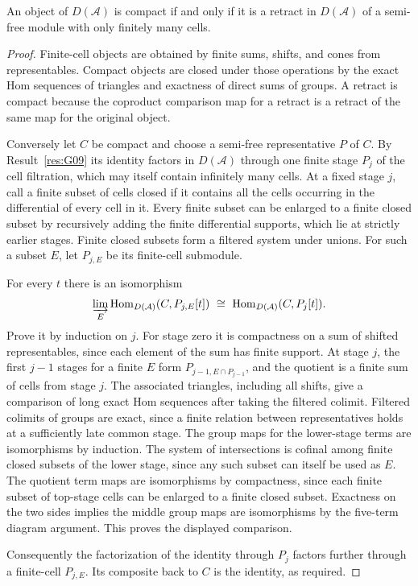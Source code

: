 \begin{theorem}\label{res:G11}
An object of \(D(\mathcal A)\) is compact if and only if it is
a retract in \(D(\mathcal A)\) of a semi-free module with only
finitely many cells.
\end{theorem}
\begin{proof}
Finite-cell objects are obtained by finite sums, shifts, and
cones from representables. Compact objects are closed under
those operations by the exact Hom sequences of triangles and
exactness of direct sums of groups. A retract is compact because
the coproduct comparison map for a retract is a retract of the
same map for the original object.

Conversely let \(C\) be compact and choose a semi-free
representative \(P\) of \(C\). By Result~\ref{res:G09} its identity
factors in \(D(\mathcal A)\) through one finite stage \(P_j\) of
the cell filtration, which may itself contain infinitely many
cells. At a fixed stage \(j\), call a finite subset of cells
closed if it contains all the cells occurring in the differential of
every cell in it. Every finite subset can be enlarged to a finite
closed subset by recursively adding the finite differential
supports, which lie at strictly earlier stages. Finite closed
subsets form a filtered system under unions. For such a subset
\(E\), let \(P_{j,E}\) be its finite-cell submodule.

For every \(t\) there is an isomorphism
\[
 \varinjlim_E\operatorname{Hom}_{D(\mathcal A)}(C,P_{j,E}[t])
     \ \cong\ \operatorname{Hom}_{D(\mathcal A)}(C,P_j[t]).
\]
Prove it by induction on \(j\). For stage zero it is compactness
on a sum of shifted representables, since each element of the sum
has finite support. At stage \(j\), the first \(j-1\) stages for a
finite \(E\) form \(P_{j-1,E\cap P_{j-1}}\), and the quotient is a
finite sum of cells from stage \(j\). The associated triangles,
including all shifts, give a comparison of long exact Hom sequences
after taking the filtered colimit. Filtered colimits of groups
are exact, since a finite relation between representatives holds
at a sufficiently late common stage. The group maps for the
lower-stage terms are isomorphisms by induction. The system of
intersections is cofinal among finite closed subsets of the
lower stage, since any such subset can itself be used as \(E\).
The quotient term maps are isomorphisms by compactness, since
each finite subset of top-stage cells can be enlarged to a finite
closed subset. Exactness on the two sides implies the middle
group maps are isomorphisms by the five-term diagram argument.
This proves the displayed comparison.

Consequently the factorization of the identity through \(P_j\)
factors further through a finite-cell \(P_{j,E}\). Its composite
back to \(C\) is the identity, as required.
\end{proof}


